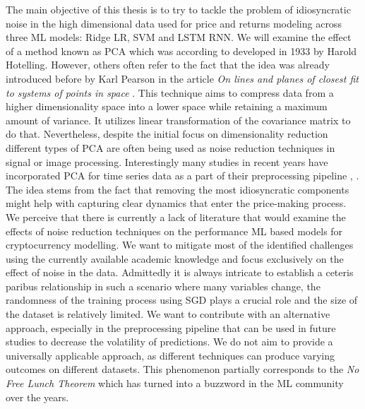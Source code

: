 The main objective of this thesis is to try to tackle the problem of idiosyncratic noise in
the high dimensional data used for price and returns modeling across three ML models: Ridge \ac{LR}, \ac{SVM}
and \ac{LSTM} \ac{RNN}.
We will examine the effect of a method known as \ac{PCA} which was according to 
\cite{Farebrother2022} developed in 1933 by Harold Hotelling. However, others often refer
to the fact 
that the idea was already introduced before by Karl Pearson in the article 
\textit{On lines and planes of closest fit to systems of points in space} \cite{Pearson1901}.
This technique aims to compress data from a higher dimensionality space into a lower space while 
retaining a maximum amount of variance. It utilizes linear transformation of the covariance matrix
to do that.
Nevertheless, despite the initial focus on dimensionality reduction different types of 
\ac{PCA} are often being used as noise reduction techniques in signal or image processing.
Interestingly many studies in recent years have incorporated \ac{PCA} for time series data 
as a part of their preprocessing pipeline \cite{Chowdhury2018}, \cite{Kristjanpoller2018}.
The idea stems from the fact that removing the most idiosyncratic components
might help with capturing clear dynamics that enter the price-making process.
We perceive that there is currently a lack of literature that would examine the effects of 
noise reduction techniques on the performance \ac{ML} based models
for cryptocurrency modelling. We want to mitigate most of the identified challenges using 
the currently available academic knowledge and focus exclusively on the effect of noise in the data. 
Admittedly it is always intricate to establish a ceteris paribus relationship in such a scenario
where many variables change, the randomness of the training process using \ac{SGD} plays a crucial role 
and the size of the dataset is relatively limited. We want to contribute with an alternative approach, especially 
in the preprocessing pipeline that can be used in future studies to decrease the volatility of predictions.
We do not aim to provide a universally applicable approach, as different techniques 
can produce varying outcomes on different datasets.
This phenomenon partially corresponds to the \textit{No Free Lunch Theorem} \cite{Wolpert1995} which
has turned into a buzzword in the \ac{ML} community over the years.


